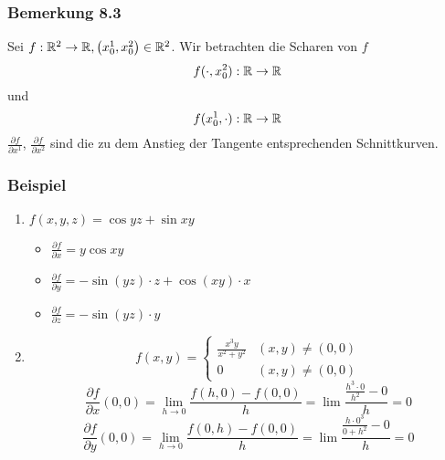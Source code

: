\subsubsection*{Bemerkung 8.3}
Sei $f:\mathbb{R}^2\to\mathbb{R}, \left(x_0^1,x_0^2\right)\in\mathbb{R}^2$. Wir betrachten die Scharen von $f$ \[f(\cdot ,x_0^2):\mathbb{R}\to \mathbb{R}\] und \[f(x_0^1,\cdot ):\mathbb{R}\to\mathbb{R}\] $\frac{\partial f}{\partial x^1}$, $\frac{\partial f}{\partial x^2}$ sind die zu dem Anstieg der Tangente entsprechenden Schnittkurven.

\subsubsection*{Beispiel}
\begin{enumerate}
\item $f(x,y,z)=\cos yz+\sin xy$
\begin{itemize}
\item $\frac{\partial f}{\partial x}=y\cos xy$
\item $\frac{\partial f}{\partial y}=-\sin(yz)\cdot z+\cos(xy)\cdot x$
\item $\frac{\partial f}{\partial z}=-\sin(yz)\cdot y$
\end{itemize}
\item \[f(x,y) = \left\{ {\begin{array}{*{20}{c}}
{\frac{{{x^3}y}}{{{x^2} + {y^2}}}}&{(x,y)\not  = (0,0)}\\
0&{(x,y)\not  = (0,0)}
\end{array}} \right.\]
\[\frac{{\partial f}}{{\partial x}}(0,0) = \mathop {\lim }\limits_{h \to 0} \frac{{f(h,0) - f(0,0)}}{h} = \lim \frac{{\frac{{{h^3} \cdot 0}}{{{h^2}}} - 0}}{h} = 0\]
\[\frac{{\partial f}}{{\partial y}}(0,0) = \mathop {\lim }\limits_{h \to 0} \frac{{f(0,h) - f(0,0)}}{h} = \lim \frac{{\frac{{h \cdot {0^3}}}{{0 + {h^2}}} - 0}}{h} = 0\]
\end{enumerate}
